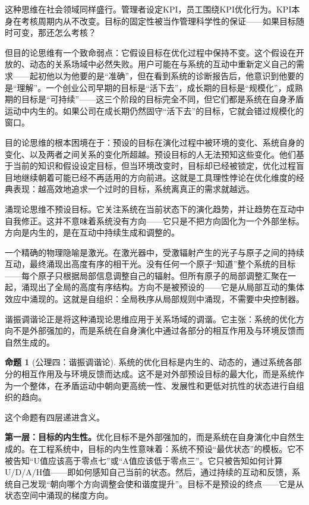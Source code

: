 \documentclass[11pt,a4paper]{book}
\theoremstyle{definition}
\newtheorem{proposition}{命题}[chapter]
\begin{document}
这种思维在社会领域同样盛行。管理者设定KPI，员工围绕KPI优化行为。KPI本身在考核周期内从不改变。目标的固定性被当作管理科学性的保证——如果目标随时可变，那还怎么考核？

但目的论思维有一个致命弱点：它假设目标在优化过程中保持不变。这个假设在开放的、动态的关系场域中必然失败。用户可能在与系统的互动中重新定义自己的需求——起初他以为他要的是“准确”，但在看到系统的诊断报告后，他意识到他要的是“理解”。一个创业公司早期的目标是“活下去”，成长期的目标是“规模化”，成熟期的目标是“可持续”——这三个阶段的目标完全不同，但它们都是系统在自身矛盾运动中内生的。如果公司在成长期仍然固守“活下去”的目标，它就会错过规模化的窗口。

目的论思维的根本困境在于：预设的目标在演化过程中被环境的变化、系统自身的变化、以及两者之间关系的变化所超越。预设目标的人无法预知这些变化。他们基于当前的知识和假设设定目标，但当环境改变时，目标却已经被锁定，优化过程盲目地继续朝着可能已经不再适用的方向前进。这就是工具理性悖论在优化维度的经典表现：越高效地追求一个过时的目标，系统离真正的需求就越远。

涌现论思维不预设目标。它关注系统在当前状态下的演化趋势，并让趋势在互动中自我修正。这并不意味着系统没有方向——它只是不把方向固化为一个外部坐标。方向是内生的，是在互动中持续生成和调整的。

一个精确的物理隐喻是激光。在激光器中，受激辐射产生的光子与原子之间的持续互动，最终涌现出高度有序的相干光。没有任何一个原子“知道”整个系统的目标——每个原子只根据局部信息调整自己的辐射。但所有原子的局部调整汇聚在一起，涌现出了全局的高度有序结构。方向不是被预设的——它是从局部互动的集体效应中涌现的。这就是自组织：全局秩序从局部规则中涌现，不需要中央控制器。

谐振调谐论正是将这种涌现论思维应用于关系场域的调谐。它主张：系统的优化方向不是外部强加的，而是系统在自身演化中通过各部分的相互作用及与环境反馈而自然生成的。

\begin{proposition}[公理四：谐振调谐论]
系统的优化目标是内生的、动态的，通过系统各部分的相互作用及与环境反馈而达成。这不是对外部预设目标的最大化，而是系统作为一个整体，在矛盾运动中朝向更高统一性、发展性和更低对抗性的状态进行自组织的趋向。
\end{proposition}

这个命题有四层递进含义。

\textbf{第一层：目标的内生性。}优化目标不是外部强加的，而是系统在自身演化中自然生成的。在工程系统中，目标的内生性意味着：系统不预设“最优状态”的模板。它不被告知“U值应该高于零点七”或“A值应该低于零点三”。它只被告知如何计算U/D/A/H值——即如何感知自己当前的状态。然后，通过持续的互动和反馈，系统自己发现“朝向哪个方向调整会使和谐度提升”。目标不是预设的终点——它是从状态空间中涌现的梯度方向。
\end{document}
